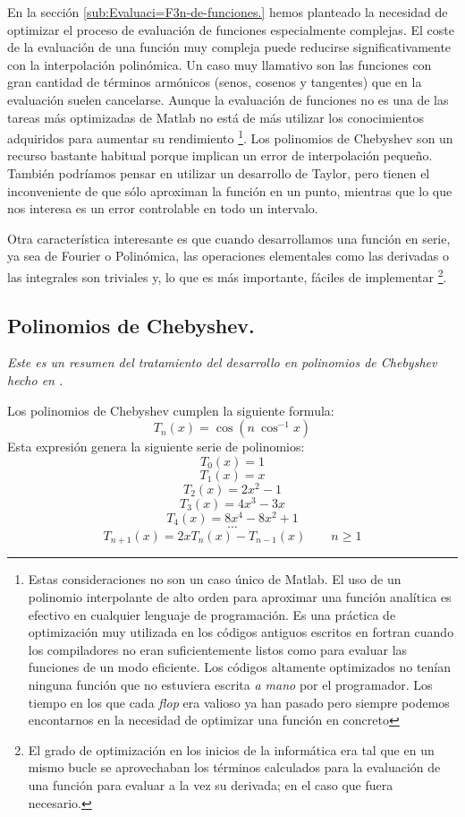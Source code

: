 En la sección \ref{sub:Evaluaci=F3n-de-funciones.} hemos planteado la
necesidad de optimizar el proceso de evaluación de funciones
especialmente complejas.  El coste de la evaluación de una función muy
compleja puede reducirse significativamente con la interpolación
polinómica. Un caso muy llamativo son las funciones con gran cantidad
de términos armónicos (senos, cosenos y tangentes) que en la
evaluación suelen cancelarse. Aunque la evaluación de funciones no es
una de las tareas más optimizadas de Matlab no está de más utilizar
los conocimientos adquiridos para aumentar su rendimiento%
\footnote{Estas consideraciones no son un caso único de Matlab. El uso
  de un polinomio interpolante de alto orden para aproximar una
  función analítica es efectivo en cualquier lenguaje de programación.
  Es una práctica de optimización muy utilizada en los códigos
  antiguos escritos en fortran cuando los compiladores no eran
  suficientemente listos como para evaluar las funciones de un modo
  eficiente. Los códigos altamente optimizados no tenían ninguna
  función que no estuviera escrita \emph{a mano} por el programador.
  Los tiempo en los que cada \emph{flop} era valioso ya han pasado
  pero siempre podemos encontarnos en la necesidad de optimizar una
  función en concreto%
}. Los polinomios de Chebyshev son un recurso bastante habitual porque
implican un error de interpolación pequeño. También podríamos pensar
en utilizar un desarrollo de Taylor, pero tienen el inconveniente de
que sólo aproximan la función en un punto, mientras que lo que nos
interesa es un error controlable en todo un intervalo.

Otra característica interesante es que cuando desarrollamos una
función en serie, ya sea de Fourier o Polinómica, las operaciones
elementales como las derivadas o las integrales son triviales y, lo
que es más importante, fáciles de implementar%
\footnote{El grado de optimización en los inicios de la informática
  era tal que en un mismo bucle se aprovechaban los términos
  calculados para la evaluación de una función para evaluar a la vez
  su derivada; en el caso que fuera necesario.%
}.


\subsection{Polinomios de Chebyshev.}

\emph{Este es un resumen del tratamiento del desarrollo en polinomios
  de Chebyshev hecho en \cite{Numerical}.}

Los polinomios de Chebyshev cumplen la siguiente formula:
$$T_{n}(x)=\cos(n\ \cos^{-1}x)$$
Esta expresión genera la siguiente serie de polinomios:
$$ T_{0}(x)=1$$
$$
T_{1}(x)=x$$
$$
T_{2}(x)=2x^{2}-1$$
$$
T_{3}(x)=4x^{3}-3x$$
$$
T_{4}(x)=8x^{4}-8x^{2}+1$$
$$
\cdots$$
$$
T_{n+1}(x)=2xT_{n}(x)-T_{n-1}(x)\qquad n\geq1$$


